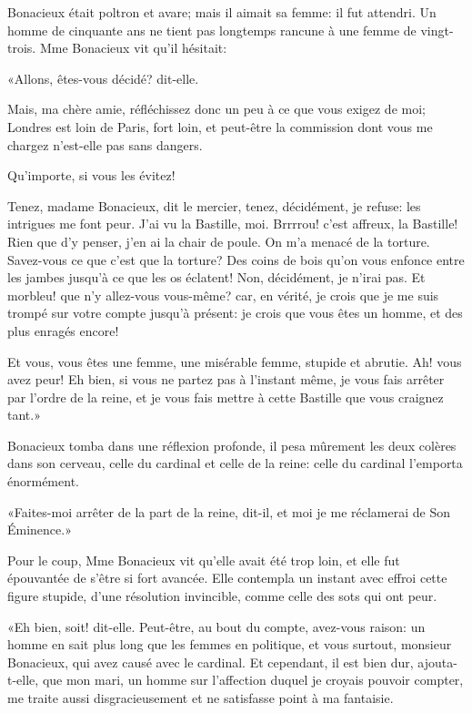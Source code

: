 Bonacieux était poltron et avare; mais il aimait sa femme: il fut attendri. Un homme de cinquante ans ne tient pas longtemps rancune à une femme de vingt-trois. Mme Bonacieux vit qu'il hésitait: 

«Allons, êtes-vous décidé? dit-elle. 

\speak  Mais, ma chère amie, réfléchissez donc un peu à ce que vous exigez de moi; Londres est loin de Paris, fort loin, et peut-être la commission dont vous me chargez n'est-elle pas sans dangers. 

\speak  Qu'importe, si vous les évitez! 

\speak  Tenez, madame Bonacieux, dit le mercier, tenez, décidément, je refuse: les intrigues me font peur. J'ai vu la Bastille, moi. Brrrrou! c'est affreux, la Bastille! Rien que d'y penser, j'en ai la chair de poule. On m'a menacé de la torture. Savez-vous ce que c'est que la torture? Des coins de bois qu'on vous enfonce entre les jambes jusqu'à ce que les os éclatent! Non, décidément, je n'irai pas. Et morbleu! que n'y allez-vous vous-même? car, en vérité, je crois que je me suis trompé sur votre compte jusqu'à présent: je crois que vous êtes un homme, et des plus enragés encore! 

\speak  Et vous, vous êtes une femme, une misérable femme, stupide et abrutie. Ah! vous avez peur! Eh bien, si vous ne partez pas à l'instant même, je vous fais arrêter par l'ordre de la reine, et je vous fais mettre à cette Bastille que vous craignez tant.» 

Bonacieux tomba dans une réflexion profonde, il pesa mûrement les deux colères dans son cerveau, celle du cardinal et celle de la reine: celle du cardinal l'emporta énormément. 

«Faites-moi arrêter de la part de la reine, dit-il, et moi je me réclamerai de Son Éminence.» 

Pour le coup, Mme Bonacieux vit qu'elle avait été trop loin, et elle fut épouvantée de s'être si fort avancée. Elle contempla un instant avec effroi cette figure stupide, d'une résolution invincible, comme celle des sots qui ont peur. 

«Eh bien, soit! dit-elle. Peut-être, au bout du compte, avez-vous raison: un homme en sait plus long que les femmes en politique, et vous surtout, monsieur Bonacieux, qui avez causé avec le cardinal. Et cependant, il est bien dur, ajouta-t-elle, que mon mari, un homme sur l'affection duquel je croyais pouvoir compter, me traite aussi disgracieusement et ne satisfasse point à ma fantaisie. 

